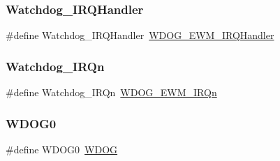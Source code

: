 \subsubsection{\texorpdfstring{Watchdog\+\_\+\+I\+R\+Q\+Handler}{Watchdog\_IRQHandler}}
{\footnotesize\ttfamily \#define Watchdog\+\_\+\+I\+R\+Q\+Handler~\mbox{\hyperlink{startup__mk64f12_8c_afdad131f6885761992073c09894b7c8f}{W\+D\+O\+G\+\_\+\+E\+W\+M\+\_\+\+I\+R\+Q\+Handler}}}

\mbox{\label{group___s_d_k___compatibility___symbols_gabd83dbd0f4d0283ee385793ca1c0235c}} 
\subsubsection{\texorpdfstring{Watchdog\+\_\+\+I\+R\+Qn}{Watchdog\_IRQn}}
{\footnotesize\ttfamily \#define Watchdog\+\_\+\+I\+R\+Qn~\mbox{\hyperlink{group___interrupt__vector__numbers_gga666eb0caeb12ec0e281415592ae89083a0bff68ffa0f6a24e0103f156f26487b3}{W\+D\+O\+G\+\_\+\+E\+W\+M\+\_\+\+I\+R\+Qn}}}

\mbox{\label{group___s_d_k___compatibility___symbols_ga2786c4aa52de96f5701346b6cb16ac97}} 
\subsubsection{\texorpdfstring{W\+D\+O\+G0}{WDOG0}}
{\footnotesize\ttfamily \#define W\+D\+O\+G0~\mbox{\hyperlink{group___w_d_o_g___register___masks_gab938901a5fa5443253fc293ebd0399e3}{W\+D\+OG}}}


